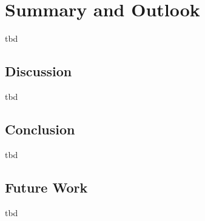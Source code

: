 \chapter{Summary and Outlook} \label{chap:outlook}

tbd

\section{Discussion} \label{sec:discussion}

tbd

\newpage

\section{Conclusion} \label{sec:conclusion}

tbd

\newpage

\section{Future Work} \label{sec:future-work}

tbd

\newpage
